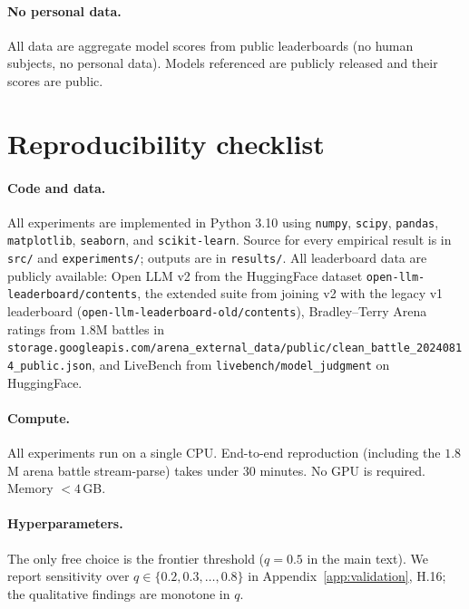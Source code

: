 \documentclass{article}
\begin{document}
\paragraph{No personal data.} All data are aggregate model scores
from public leaderboards (no human subjects, no personal data).
Models referenced are publicly released and their scores are
public.

\section{Reproducibility checklist}
\label{app:repro}

\paragraph{Code and data.} All experiments are implemented in
Python 3.10 using \texttt{numpy}, \texttt{scipy}, \texttt{pandas},
\texttt{matplotlib}, \texttt{seaborn}, and \texttt{scikit-learn}.
Source for every empirical result is in \texttt{src/} and
\texttt{experiments/}; outputs are in \texttt{results/}. All
leaderboard data are publicly available: Open LLM v2 from the
HuggingFace dataset \texttt{open-llm-leaderboard/contents}, the
extended suite from joining v2 with the legacy v1 leaderboard
(\texttt{open-llm-leaderboard-old/contents}), Bradley--Terry Arena
ratings from $1.8$M battles in
\texttt{storage.googleapis.com/arena\_external\_data/public/clean\_battle\_20240814\_public.json},
and LiveBench from \texttt{livebench/model\_judgment} on HuggingFace.

\paragraph{Compute.} All experiments run on a single CPU. End-to-end
reproduction (including the $1.8$M arena battle stream-parse) takes
under $30$ minutes. No GPU is required. Memory $< 4$\,GB.

\paragraph{Hyperparameters.} The only free choice is the frontier
threshold ($q = 0.5$ in the main text). We report sensitivity over
$q \in \{0.2, 0.3, \ldots, 0.8\}$ in
Appendix~\ref{app:validation}, H.16; the qualitative findings are
monotone in $q$.
\end{document}

